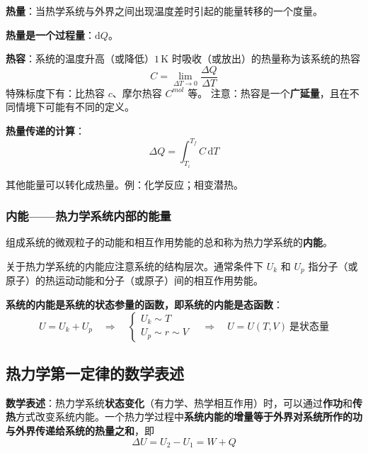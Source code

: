 \documentclass[UTF8]{ctexart}
\theoremstyle{definition}
\begin{document}
\textbf{热量}：当热学系统与外界之间出现温度差时引起的能量转移的一个度量。

\textbf{热量是一个过程量}：$\mathrm{d}Q$。

\textbf{热容}：系统的温度升高（或降低）$1\,\mathrm{K}$ 时吸收（或放出）的热量称为该系统的热容
\begin{equation}
C = \lim_{\Delta T\to 0}\frac{\Delta Q}{\Delta T}
\end{equation}
特殊标度下有：比热容 $c$、摩尔热容 $C^{mol}$ 等。
注意：热容是一个\textbf{广延量}，且在不同情境下可能有不同的定义。

\textbf{热量传递的计算}：
\begin{equation}
\Delta Q = \int_{T_i}^{T_f} C\,\mathrm{d}T
\end{equation}

其他能量可以转化成热量。例：化学反应；相变潜热。

\subsubsection*{内能——热力学系统内部的能量}

组成系统的微观粒子的动能和相互作用势能的总和称为热力学系统的\textbf{内能}。

关于热力学系统的内能应注意系统的结构层次。通常条件下 $U_k$ 和 $U_p$ 指分子（或原子）的热运动动能和分子（或原子）间的相互作用势能。

\textbf{系统的内能是系统的状态参量的函数，即系统的内能是态函数}：
\begin{equation}
U = U_k + U_p \quad\Rightarrow\quad
\begin{cases}
U_k \sim T \\
U_p \sim r \sim V
\end{cases}
\quad\Rightarrow\quad
U = U(T,V)\ \text{是状态量}
\end{equation}

\subsection{热力学第一定律的数学表述}

\textbf{数学表述}：热力学系统\textbf{状态变化}（有力学、热学相互作用）时，可以通过\textbf{作功}和\textbf{传热}方式改变系统内能。一个热力学过程中\textbf{系统内能的增量等于外界对系统所作的功与外界传递给系统的热量之和}，即
\begin{equation}
\boxed{\Delta U = U_2 - U_1 = W + Q}
\end{equation}
\end{document}
